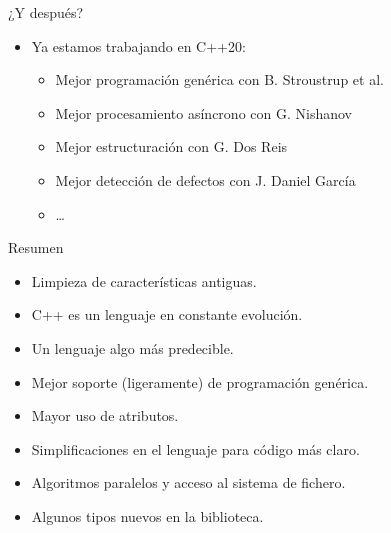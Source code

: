 \begin{frame}[t]{¿Y después?}
\begin{itemize}
  \item Ya estamos trabajando en C++20:
    \begin{itemize}
      \item Mejor programación genérica con  {B. Stroustrup et al.}
      \item Mejor procesamiento asíncrono con  {G. Nishanov}
      \item Mejor estructuración con  {G. Dos Reis}
      \item Mejor detección de defectos con  {J. Daniel García}
      \item \ldots
    \end{itemize}
\end{itemize}
\end{frame}

\begin{frame}[t]{Resumen}
\begin{itemize}[<+->]
  \item Limpieza de características antiguas.
  \item C++ es un lenguaje en constante evolución.
  \item Un lenguaje algo más predecible.
  \item Mejor soporte (ligeramente) de programación genérica.
  \item Mayor uso de atributos.
  \item Simplificaciones en el lenguaje para código más claro.
  \item Algoritmos paralelos y acceso al sistema de fichero.
  \item Algunos tipos nuevos en la biblioteca.
\end{itemize}
\end{frame}


